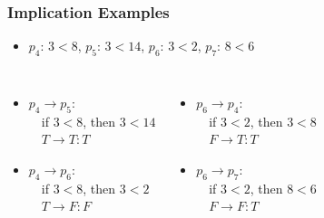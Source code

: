 \documentclass[dvipsnames]{beamer}
\begin{document}
\begin{frame}
  \frametitle{Implication Examples}

  \begin{itemize}
    \item $p_4$: $3<8$, $p_5$: $3<14$, $p_6$: $3<2$, $p_7$: $8<6$
  \end{itemize}

  \pause
  \begin{columns}[t]
      \begin{itemize}
        \item $p_4 \rightarrow p_5$:\\
          ~~if $3 < 8$, then $3 < 14$\\
          ~~$T \rightarrow T : T$
        \pause
        \item $p_4 \rightarrow p_6$:\\
          ~~if $3 < 8$, then $3 < 2$\\
          ~~$T \rightarrow F : F$
      \end{itemize}

    \pause
      \begin{itemize}
        \item $p_6 \rightarrow p_4$:\\
        ~~if $3 < 2$, then $3 < 8$\\
        ~~$F \rightarrow T : T$
        \pause
        \item $p_6 \rightarrow p_7$:\\
        ~~if $3 < 2$, then $8 < 6$\\
        ~~$F \rightarrow F : T$
      \end{itemize}
  \end{columns}
\end{frame}
\end{document}
